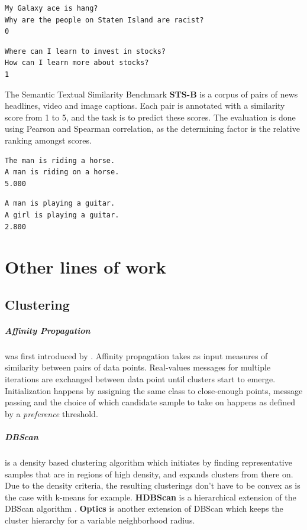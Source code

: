 \documentclass[a4paper,12pt,twoside,openright]{report}
\begin{document}
\begin{verbatim}
My Galaxy ace is hang?	
Why are the people on Staten Island are racist?	
0
\end{verbatim}

\begin{verbatim}
Where can I learn to invest in stocks?	
How can I learn more about stocks?	
1
\end{verbatim}

The Semantic Textual Similarity Benchmark \textbf{STS-B} \cite{cer2017} is a corpus of pairs of news headlines, video and image captions.
Each pair is annotated with a similarity score from 1 to 5, and the task is to predict these scores.
The evaluation is done using Pearson and Spearman correlation, as the determining factor is the relative ranking amongst scores.


\begin{verbatim}
The man is riding a horse.	
A man is riding on a horse.	
5.000
\end{verbatim}

\begin{verbatim}
A man is playing a guitar.
A girl is playing a guitar.	
2.800
\end{verbatim}


\chapter{Other lines of work}

\section{Clustering}\label{appendix:Clustering}

\paragraph{Affinity Propagation} was first introduced by \cite{frey07}.
Affinity propagation takes as input measures of similarity between pairs of data points. 
Real-values messages for multiple iterations are exchanged between data point until clusters start to emerge.
Initialization happens by assigning the same class to close-enough points, message passing and the choice of which candidate sample to take on happens as defined by a \textit{preference} threshold.

\paragraph{DBScan} is a density based clustering algorithm \cite{ester96} which initiates by finding representative samples that are in regions of high density, and expands clusters from there on.
Due to the density criteria, the resulting clusterings don't have to be convex as is the case with k-means for example. \textbf{HDBScan} is a hierarchical extension of the DBScan algorithm \cite{campello13}. \textbf{Optics} \cite{mihael99} is another extension of DBScan which keeps the cluster hierarchy for a variable neighborhood radius.
\end{document}
